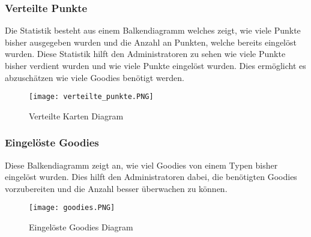 \subsubsection{Verteilte Punkte}
Die Statistik besteht aus einem Balkendiagramm welches zeigt, wie viele Punkte bisher ausgegeben wurden und die Anzahl an Punkten, welche bereits eingelöst wurden. 
Diese Statistik hilft den Administratoren zu sehen wie viele Punkte bisher verdient wurden und wie viele Punkte eingelöst wurden. Dies ermöglicht es abzuschätzen wie viele Goodies benötigt werden. 	
\begin{figure}[H]
	\centering
	\texttt{[image: verteilte\_punkte.PNG]}
	\caption{Verteilte Karten Diagram}
\end{figure}
\newpage
\subsubsection{Eingelöste Goodies}
Diese Balkendiagramm zeigt an, wie viel Goodies von einem Typen bisher eingelöst wurden. Dies hilft den Administratoren dabei, die benötigten Goodies vorzubereiten und die Anzahl besser überwachen zu können. 
\begin{figure}[H]
	\centering
	\texttt{[image: goodies.PNG]}
	\caption{Eingelöste Goodies Diagram}
\end{figure}